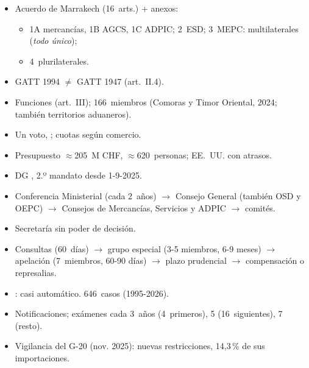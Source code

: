 \documentclass{article}
\begin{document}
\begin{columnas}
\begin{itemize}
\item Acuerdo de Marrakech (16~arts.) + anexos:
  \begin{itemize}
  \item 1A mercancías, 1B AGCS, 1C ADPIC; 2~ESD; 3~MEPC: multilaterales (\emph{todo único});
  \item 4~plurilaterales.
  \end{itemize}
\item GATT 1994 $\neq$ GATT 1947 (art.~II.4).
\end{itemize}
\begin{itemize}
\item Funciones (art.~III); 166~miembros (Comoras y Timor Oriental, 2024; también territorios aduaneros).
\item Un voto, ; cuotas según comercio.
\item Presupuesto $\approx$205~M CHF, $\approx$620~personas; EE.~UU. con atrasos.
\item DG , 2.º mandato desde 1-9-2025.
\end{itemize}
\begin{itemize}
\item Conferencia Ministerial (cada 2~años) $\to$ Consejo General (también OSD y OEPC) $\to$ Consejos de Mercancías, Servicios y ADPIC $\to$ comités.
\item Secretaría sin poder de decisión.
\end{itemize}
\begin{itemize}
\item Consultas (60~días) $\to$ grupo especial (3-5 miembros, 6-9 meses) $\to$ apelación (7~miembros, 60-90 días) $\to$ plazo prudencial $\to$ compensación o represalias.
\item {}: casi automático. 646~casos (1995-2026).
\end{itemize}
\begin{itemize}
\item Notificaciones; exámenes cada 3~años (4~primeros), 5 (16~siguientes), 7 (resto).
\item Vigilancia del G-20 (nov. 2025): nuevas restricciones, 14,3\,\% de sus importaciones.
\end{itemize}


\end{columnas}
\end{document}
